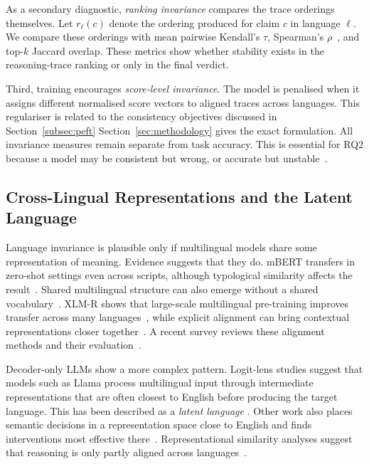As a secondary diagnostic, \emph{ranking invariance} compares the trace orderings themselves. Let
$r_\ell(c)$ denote the ordering produced for claim $c$ in language $\ell$. We
compare these orderings with mean pairwise Kendall's $\tau$, Spearman's
$\rho$~\cite{kendall1938new,spearman1904proof}, and top-$k$ Jaccard overlap. These
metrics show whether stability exists in the reasoning-trace ranking or only in
the final verdict.

Third, training encourages \emph{score-level invariance}. The model is penalised
when it assigns different normalised score vectors to aligned traces across
languages. This regulariser is related to the consistency objectives discussed in
Section~\ref{subsec:peft} Section~\ref{sec:methodology} gives the exact
formulation. All invariance measures remain separate from task accuracy. This is
essential for RQ2 because a model may be consistent but wrong, or accurate but
unstable~\cite{elazar2021measuringimprovingconsistencypretrained, Qi_2023}.

\subsection{Cross-Lingual Representations and the Latent Language}
\label{subsec:representations}

Language invariance is plausible only if multilingual models share some
representation of meaning. Evidence suggests that they do. mBERT transfers in
zero-shot settings even across scripts, although typological similarity affects
the result~\cite{pires2019multilingualmultilingualbert}. Shared multilingual
structure can also emerge without a shared
vocabulary~\cite{wu2020emergingcrosslingualstructurepretrained}. XLM-R shows that
large-scale multilingual pre-training improves transfer across many
languages~\cite{conneau2020unsupervisedcrosslingualrepresentationlearning}, while
explicit alignment can bring contextual representations closer
together~\cite{cao2020multilingualalignmentcontextualword}. A recent survey reviews
these alignment methods and their evaluation~\cite{hämmerl2024understandingcrosslingualalignment}.

Decoder-only LLMs show a more complex pattern. Logit-lens studies suggest that
models such as Llama process multilingual input through intermediate
representations that are often closest to English before producing the target
language. This has been described as a \emph{latent language}
\cite{wendler2024llamasworkenglishlatent}. Other work also places semantic
decisions in a representation space close to English and finds interventions most
effective there~\cite{schut2025multilingualllmsthinkenglish}. Representational
similarity analyses suggest that reasoning is only partly aligned across
languages~\cite{STOLLE2026100250}.

